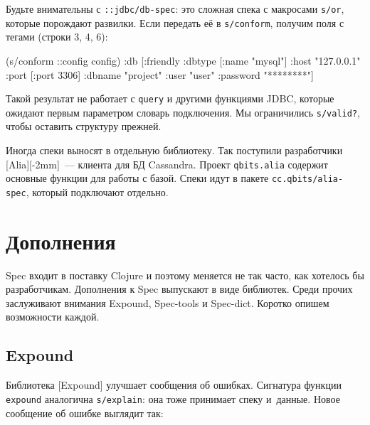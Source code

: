 \fi

\label{jdbc-conform-warning}


Будьте внимательны с \verb|::jdbc/db-spec|: это сложная спека с макросами
\verb|s/or|, которые порождают развилки. Если передать её в
\verb|s/conform|, получим поля с тегами (строки 3, 4, 6):

\begin{english}
  \begin{clojure/lines}
(s/conform ::config config)
{:db
 [:friendly
  {:dbtype   [:name "mysql"]
   :host     "127.0.0.1"
   :port     [:port 3306]
   :dbname   "project"
   :user     "user"
   :password "********"}]}
  \end{clojure/lines}
\end{english}

Такой результат не работает с \verb|query| и другими функциями JDBC, которые
ожидают первым параметром словарь подключения. Мы ограничились \verb|s/valid?|,
чтобы оставить структуру прежней.

Иногда спеки выносят в отдельную библиотеку. Так поступили разработчики
[Alia][-2mm]~--- клиента для БД
Cassandra. Проект \verb|qbits.alia| содержит основные функции для работы с
базой. Спеки идут в пакете \verb|cc.qbits/alia-spec|, который подключают
отдельно.

\section{Дополнения}

Spec входит в поставку Clojure и поэтому меняется не так часто, как хотелось бы
разработчикам. Дополнения к Spec выпускают в виде библиотек. Среди прочих
заслуживают внимания Expound, Spec-tools и Spec-dict. Коротко опишем возможности каждой.

\subsection*{Expound}


Библиотека [Expound] улучшает сообщения об
ошибках. Сигнатура функции \verb|expound| аналогична \verb|s/explain|: она
тоже принимает спеку и~данные. Новое сообщение об ошибке выглядит так:


